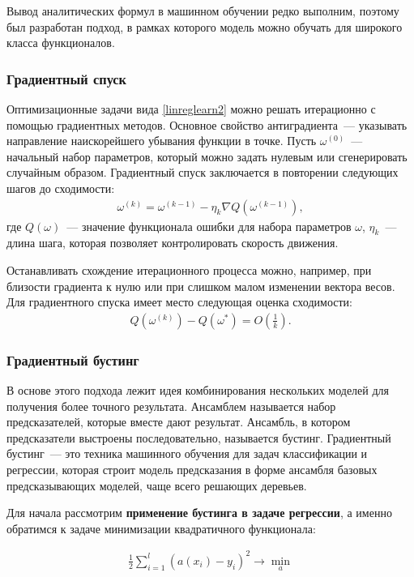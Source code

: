 \documentclass[12pt,a4paper]{article} %
\begin{document}
Вывод аналитических формул в машинном обучении редко выполним, поэтому был разработан подход, в рамках которого модель можно обучать для широкого класса функционалов.

\subsubsection{Градиентный спуск}

Оптимизационные задачи вида \ref{linreglearn2} можно решать итерационно с помощью градиентных методов. Основное свойство антиградиента~--- указывать направление наискорейшего убывания функции в точке. Пусть $\omega^{(0)}$~--- начальный набор параметров, который можно задать нулевым или сгенерировать случайным образом. Градиентный спуск заключается в повторении следующих шагов до сходимости:
 \begin{gather}\label{gradmet1}
	\omega^{(k)} = \omega^{(k-1)} - \eta_k\nabla Q (\omega^{(k-1)}),
\end{gather}
где $Q(\omega)$~--- значение функционала ошибки для набора параметров $\omega$, $\eta_k$~--- длина шага, которая позволяет контролировать скорость движения.

Останавливать схождение итерационного процесса можно, например, при близости градиента к нулю или при слишком малом изменении вектора весов. Для градиентного спуска имеет место следующая оценка сходимости:
 \begin{gather}\label{gradmet2}
	Q(\omega^{(k)})-Q(\omega^*) = O\left(\frac{1}{k}\right).
\end{gather}

\subsubsection{Градиентный бустинг}

В основе этого подхода лежит идея комбинирования нескольких моделей для получения более точного результата. Ансамблем называется набор предсказателей, которые вместе дают результат. Ансамбль, в котором предсказатели выстроены последовательно, называется бустинг. Градиентный бустинг~--- это техника машинного обучения для задач классификации и регрессии, которая строит модель предсказания в форме ансамбля базовых предсказывающих моделей, чаще всего решающих деревьев. 

Для начала рассмотрим \textbf{применение бустинга в задаче регрессии}, а именно обратимся к задаче минимизации квадратичного функционала:

 \begin{gather}\label{bust1}
	\frac{1}{2}\sum\limits_{i=1}^{l}(a(x_i)-y_i)^2 \rightarrow \min_a
\end{gather}
\end{document}
